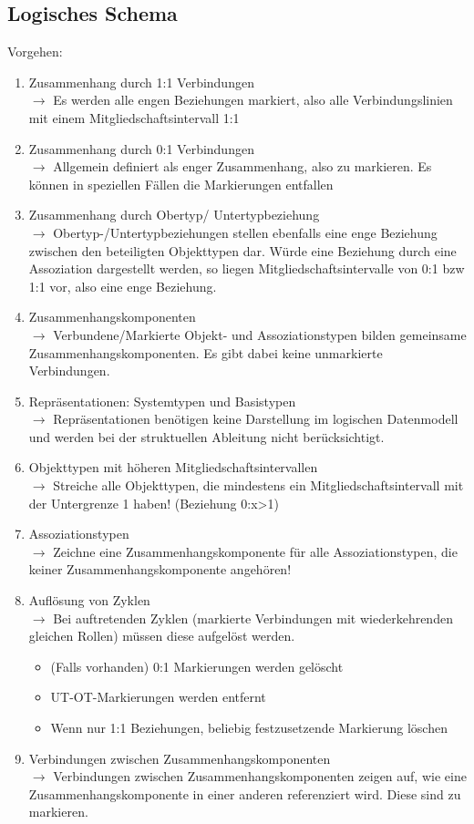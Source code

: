 \documentclass[a4paper,10pt]{scrartcl}
\begin{document}
\subsection{Logisches Schema}
Vorgehen:
\begin{enumerate}
    \item Zusammenhang durch 1:1 Verbindungen \\
    $\rightarrow$ Es werden alle engen Beziehungen markiert, also alle Verbindungslinien mit einem Mitgliedschaftsintervall 1:1
    \item Zusammenhang durch 0:1 Verbindungen \\
    $\rightarrow$ Allgemein definiert als enger Zusammenhang, also zu markieren. Es können in speziellen Fällen die Markierungen entfallen
    \item Zusammenhang durch Obertyp/ Untertypbeziehung \\
    $\rightarrow$ Obertyp-/Untertypbeziehungen stellen ebenfalls eine enge Beziehung zwischen den beteiligten Objekttypen dar. Würde eine Beziehung durch eine Assoziation dargestellt werden, so liegen Mitgliedschaftsintervalle von 0:1 bzw 1:1 vor, also eine enge Beziehung.
    \item Zusammenhangskomponenten \\
    $\rightarrow$ Verbundene/Markierte Objekt- und Assoziationstypen bilden gemeinsame Zusammenhangskomponenten. Es gibt dabei keine unmarkierte Verbindungen.
    \item Repräsentationen: Systemtypen und Basistypen \\
    $\rightarrow$ Repräsentationen benötigen keine Darstellung im logischen Datenmodell und werden bei der struktuellen Ableitung nicht berücksichtigt. 
    \item Objekttypen mit höheren Mitgliedschaftsintervallen\\
    $\rightarrow$ Streiche alle Objekttypen, die mindestens ein Mitgliedschaftsintervall mit der Untergrenze 1 haben! (Beziehung 0:x>1)
    \item Assoziationstypen \\
    $\rightarrow$ Zeichne eine Zusammenhangskomponente für alle Assoziationstypen, die keiner Zusammenhangskomponente angehören!
    \item Auflösung von Zyklen \\
    $\rightarrow$ Bei auftretenden Zyklen (markierte Verbindungen mit wiederkehrenden gleichen Rollen) müssen diese aufgelöst werden.
    \begin{itemize}
        \item (Falls vorhanden) 0:1 Markierungen werden gelöscht 
        \item UT-OT-Markierungen werden entfernt
        \item Wenn nur 1:1 Beziehungen, beliebig festzusetzende Markierung löschen
    \end{itemize}
    \item Verbindungen zwischen Zusammenhangskomponenten \\
    $\rightarrow$ Verbindungen zwischen Zusammenhangskomponenten zeigen auf, wie eine Zusammenhangskomponente in einer anderen referenziert wird. Diese sind zu markieren.
\end{enumerate}
\end{document}
